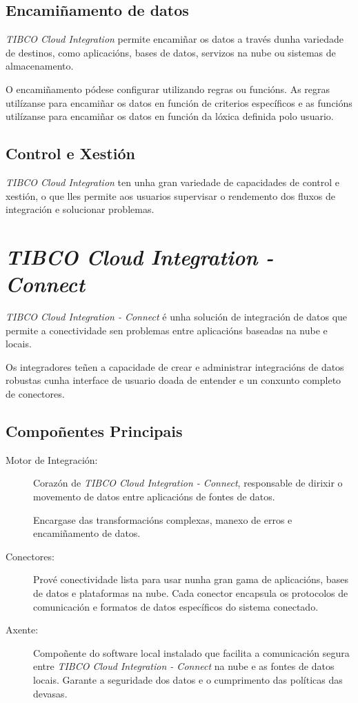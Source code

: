 \subsection{Encamiñamento de datos}

\textit{TIBCO Cloud Integration} permite encamiñar os datos a través dunha variedade de destinos, como aplicacións, bases de datos, servizos na nube ou sistemas de almacenamento.

O encamiñamento pódese configurar utilizando regras ou funcións. As regras utilízanse para encamiñar os datos en función de criterios específicos e as funcións utilízanse para encamiñar os datos en función da lóxica definida polo usuario.

\subsection{Control e Xestión}

\textit{TIBCO Cloud Integration} ten unha gran variedade de capacidades de control e xestión, o que lles permite aos usuarios supervisar o rendemento dos fluxos de integración e solucionar problemas.

\section{\textit{TIBCO Cloud Integration - Connect}}

\textit{TIBCO Cloud Integration - Connect} é  unha solución de integración de datos que permite a conectividade sen problemas entre aplicacións baseadas na nube e locais.

Os integradores teñen a capacidade de crear e administrar integracións de datos robustas cunha interface de usuario doada de entender e un conxunto completo de conectores.

\subsection{Compoñentes Principais}

\begin{description}
    \item[Motor de Integración:] Corazón de \textit{TIBCO Cloud Integration - Connect}, responsable de dirixir o movemento de datos entre aplicacións de fontes de datos.
    
    Encargase das transformacións complexas, manexo de erros e encamiñamento de datos.
    
    \item[Conectores:] Prové conectividade lista para usar nunha gran gama de aplicacións, bases de datos e plataformas na nube. Cada conector encapsula os protocolos de comunicación e formatos de datos específicos do sistema conectado.
    
    \item[Axente:] Compoñente do software local instalado que facilita a comunicación segura entre \textit{TIBCO Cloud Integration - Connect} na nube e as fontes de datos locais. Garante a seguridade dos datos e o cumprimento das políticas das devasas.
\end{description}

